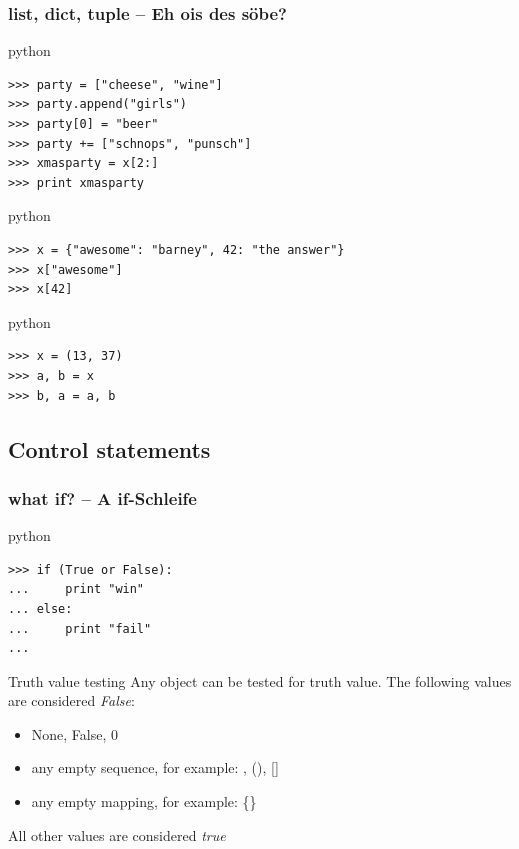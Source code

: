 \documentclass{beamer}
\begin{document}
\begin{frame}[fragile]
	\frametitle{list, dict, tuple -- Eh ois des söbe?}
	
	\begin{exampleblock}{python}
	\begin{lstlisting}
>>> party = ["cheese", "wine"]
>>> party.append("girls")
>>> party[0] = "beer"
>>> party += ["schnops", "punsch"]
>>> xmasparty = x[2:]
>>> print xmasparty
	\end{lstlisting}
	\end{exampleblock}
	
\pause
	
	\begin{exampleblock}{python}
	\begin{lstlisting}
>>> x = {"awesome": "barney", 42: "the answer"}
>>> x["awesome"]
>>> x[42]
	\end{lstlisting}
	\end{exampleblock}

\pause

	\begin{exampleblock}{python}
	\begin{lstlisting}
>>> x = (13, 37)
>>> a, b = x
>>> b, a = a, b
	\end{lstlisting}
	\end{exampleblock}
\end{frame}


\subsection{Control statements}
\begin{frame}[fragile]
    \frametitle{what \textbf{if}? -- A if-Schleife}
    
    \begin{exampleblock}{python}
    \begin{lstlisting}
>>> if (True or False):
...     print "win"
... else:
...     print "fail"
...
    \end{lstlisting}
    \end{exampleblock}
    
\pause

    \begin{block}{Truth value testing}
    Any object can be tested for truth value. The following values are considered \emph{False}:
    \begin{itemize}
        \item None, False, 0
        \item any empty sequence, for example: \grqq\grqq , (), []
        \item any empty mapping, for example: \{\}
    \end{itemize}
    All other values are considered \emph{true}
    \end{block}
\end{frame}
\end{document}
